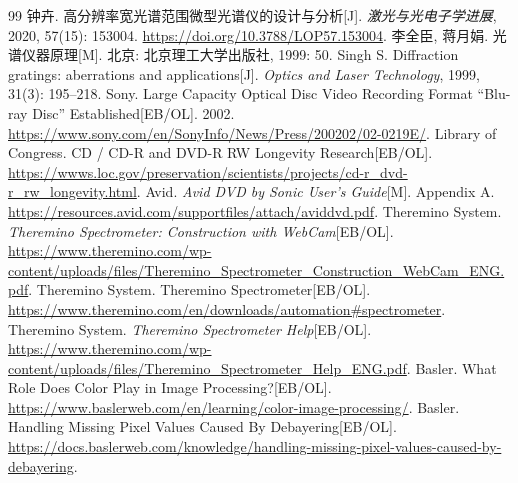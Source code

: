 \documentclass[UTF8,a4paper,12pt]{ctexart}
\begin{document}
\begin{thebibliography}{99}
 钟卉. 高分辨率宽光谱范围微型光谱仪的设计与分析[J]. \textit{激光与光电子学进展}, 2020, 57(15): 153004. \url{https://doi.org/10.3788/LOP57.153004}.
 李全臣, 蒋月娟. 光谱仪器原理[M]. 北京: 北京理工大学出版社, 1999: 50.
 Singh S. Diffraction gratings: aberrations and applications[J]. \textit{Optics and Laser Technology}, 1999, 31(3): 195--218.
 Sony. Large Capacity Optical Disc Video Recording Format ``Blu-ray Disc'' Established[EB/OL]. 2002. \url{https://www.sony.com/en/SonyInfo/News/Press/200202/02-0219E/}.
 Library of Congress. CD / CD-R and DVD-R RW Longevity Research[EB/OL]. \url{https://wwws.loc.gov/preservation/scientists/projects/cd-r_dvd-r_rw_longevity.html}.
 Avid. \textit{Avid DVD by Sonic User's Guide}[M]. Appendix A. \url{https://resources.avid.com/supportfiles/attach/aviddvd.pdf}.
 Theremino System. \textit{Theremino Spectrometer: Construction with WebCam}[EB/OL]. \url{https://www.theremino.com/wp-content/uploads/files/Theremino_Spectrometer_Construction_WebCam_ENG.pdf}.
 Theremino System. Theremino Spectrometer[EB/OL]. \url{https://www.theremino.com/en/downloads/automation#spectrometer}.
 Theremino System. \textit{Theremino Spectrometer Help}[EB/OL]. \url{https://www.theremino.com/wp-content/uploads/files/Theremino_Spectrometer_Help_ENG.pdf}.
 Basler. What Role Does Color Play in Image Processing?[EB/OL]. \url{https://www.baslerweb.com/en/learning/color-image-processing/}.
 Basler. Handling Missing Pixel Values Caused By Debayering[EB/OL]. \url{https://docs.baslerweb.com/knowledge/handling-missing-pixel-values-caused-by-debayering}.
\end{thebibliography}
\end{document}
